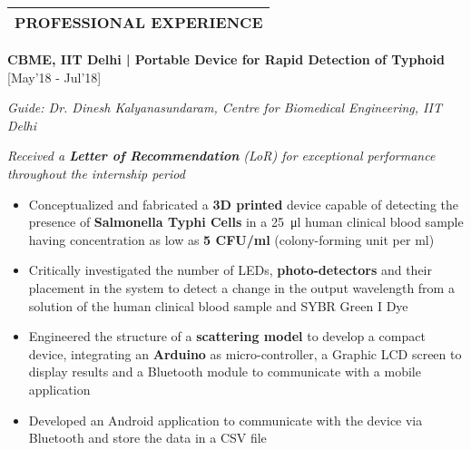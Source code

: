 \begin{tabularx}{\textwidth}{p}
    \toprule[1]
    \vspace{-2pt}
    \centerline{\textbf{\normalsize{PROFESSIONAL EXPERIENCE}}} \\ 
    \bottomrule[1]
\end{tabularx}


\item{\textbf{CBME, IIT Delhi | Portable Device for Rapid Detection of Typhoid} \hfill [May'18 - Jul'18]} \newline
\hspace{-4pt}
\begin{small}
\textit{Guide: Dr. Dinesh Kalyanasundaram, Centre for Biomedical Engineering, IIT Delhi}
\end{small}
\newline
\begin{small}
\textit{Received a \textbf{Letter of Recommendation} (LoR) for exceptional performance throughout the internship period}
\end{small}
\vspace{-7pt}
\begin{itemize}[label=\bullet]
\setlength\itemsep{-3.5pt}
\item Conceptualized and fabricated  a \textbf{3D printed} device capable of detecting the presence of \textbf{Salmonella Typhi Cells} in a \SI{25}{\micro\litre} human clinical blood sample having concentration as low as \textbf{5 CFU/ml} (colony-forming unit per ml)
\item Critically investigated the number of LEDs, \textbf{photo-detectors} and their placement in the system to detect a change in the output wavelength from a solution of the human clinical blood sample and SYBR Green I Dye
\item Engineered the structure of a \textbf{scattering model} to develop a compact device, integrating an \textbf{Arduino} as micro-controller, a Graphic LCD screen to display results and a Bluetooth module to communicate with a mobile application
\item Developed an Android application to communicate with the device via Bluetooth and store the data in a CSV file
\end{itemize}